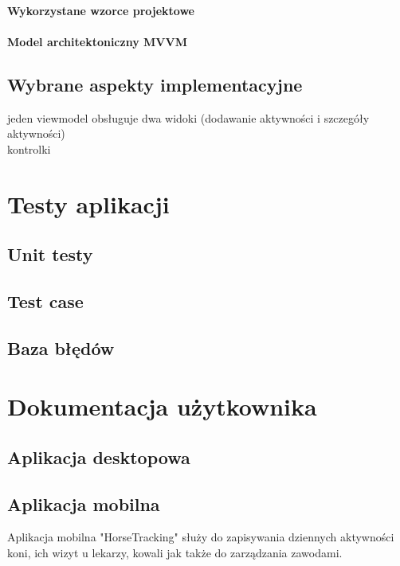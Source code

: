 \documentclass[12pt,twoside]{report}
\begin{document}
\subsubsection{Wykorzystane wzorce projektowe}
\subsubsection{Model architektoniczny MVVM}
\section{Wybrane aspekty implementacyjne}
jeden viewmodel obsługuje dwa widoki (dodawanie aktywności i szczegóły aktywności) \\
kontrolki\\
\chapter{Testy aplikacji}
\section{Unit testy}
\section{Test case}
\section{Baza błędów}
\chapter{Dokumentacja użytkownika}
\section{Aplikacja desktopowa}
\newpage
\section{Aplikacja mobilna}
Aplikacja mobilna "HorseTracking" służy do zapisywania dziennych aktywności koni, ich wizyt u lekarzy, kowali jak także do zarządzania zawodami.
\end{document}
